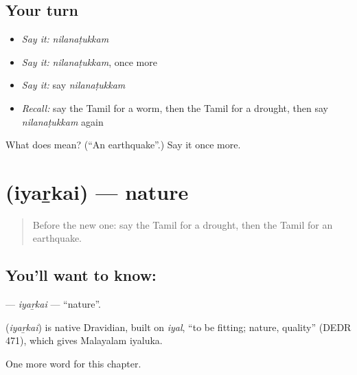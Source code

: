 \subsection*{Your turn}
\begin{itemize}
\raggedright
  \item \emph{Say it:} \emph{nilanaṭukkam}
  \item \emph{Say it:} \emph{nilanaṭukkam}, once more
  \item \emph{Say it:} say \emph{nilanaṭukkam}
  \item \emph{Recall:} say the Tamil for a worm, then the Tamil for a drought, then say \emph{nilanaṭukkam} again
\end{itemize}

\begin{tcolorbox}[breakable,colback=teal!4,colframe=teal!35!black,title={Before you move on}]
What does  mean? (\textquotedblleft{}An earthquake\textquotedblright{}.) Say it once more.
\end{tcolorbox}
\section[\texorpdfstring{\ta{இயற்கை} (iyaṟkai)}{இயற்கை (iyaṟkai)}]{ (iyaṟkai) — nature}

\label{lesson:TA-C248-iyarkai}



\begin{quote}
Before the new one: say the Tamil for a drought, then the Tamil for an earthquake.
\end{quote}

\subsection*{You'll want to know: }
\textbf{} — \emph{iyaṟkai} — \textquotedblleft{}nature\textquotedblright{}.

\begin{cousinweb}
\textbf{} (\emph{iyaṟkai}) is native Dravidian, built on \emph{iyal}, \textquotedblleft{}to be fitting; nature, quality\textquotedblright{} (DEDR 471), which gives Malayalam iyaluka.
\end{cousinweb}

\begin{grammarlens}[title={What you've built}]
One more word for this chapter.
\end{grammarlens}

